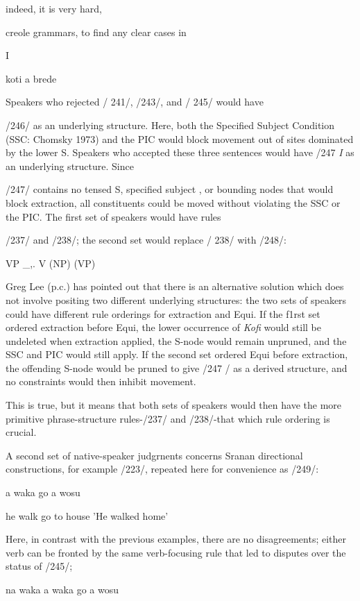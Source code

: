 indeed, it is very hard,

creole grammars, to find any clear cases in

I 

koti a brede

Speakers who rejected / 241/, /243/, and / 245/ would have

/246/ as an underlying structure. Here, both the Specified Subject Condition (SSC: Chomsky 1973) and the PIC would block movement out of sites dominated by the lower S. Speakers who accepted these three sentences would have /247 \textit{I} as an underlying structure. Since

/247/ contains no tensed S, specified subject , or bounding nodes that would block extraction, all constituents could be moved without violating the SSC or the PIC. The first set of speakers would have rules

/237/ and /238/; the second set would replace / 238/ with /248/:

\ea\label{ex:248}
 VP \_,. V (NP) (VP)
\glt
\z

Greg Lee (p.c.) has pointed out that there is an alternative solution which does not involve positing two different underlying structures: the two sets of speakers could have different rule orderings for extraction and Equi. If the f1rst set ordered extraction before Equi, the lower occurrence of \textit{Kofi} would still be undeleted when extraction applied, the S-node would remain unpruned, and the SSC and PIC would still apply. If the second set ordered Equi before ex\-traction, the offending S-node would be pruned to give /247 / as a derived structure, and no constraints would then inhibit movement.

This is true, but it means that both sets of speakers would then
have the more primitive phrase-structure rules-/237/ and /238/-that
which rule ordering is crucial.

A second set of native-speaker judgrnents concerns Sranan directional constructions, for example /223/, repeated here for conveni\-ence as /249/:

\ea\label{ex:249}
 a waka go a wosu
\glt
\z

he walk go to house 'He walked home'

Here, in contrast with the previous examples, there are no disagree\-ments; either verb can be fronted by the same verb-focusing rule that led to disputes over the status of /245/;

\ea\label{ex:250}
 na waka a waka go a wosu
\glt
\z

